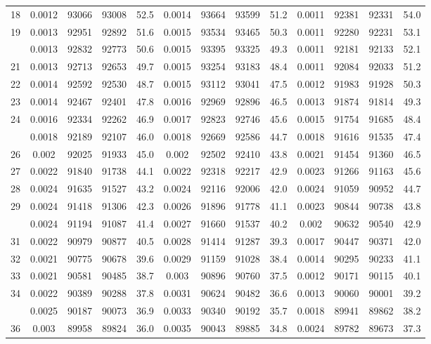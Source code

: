 \documentclass[
  14pt,
]{article}
\begin{document}
\begin{longtable}[t]{lcccccccccccc}
18 & 0.0012 & 93066 & 93008 & 52.5 & 0.0014 & 93664 & 93599 & 51.2 & 0.0011 & 92381 & 92331 & 54.0\\
19 & 0.0013 & 92951 & 92892 & 51.6 & 0.0015 & 93534 & 93465 & 50.3 & 0.0011 & 92280 & 92231 & 53.1\\
\addlinespace
20 & 0.0013 & 92832 & 92773 & 50.6 & 0.0015 & 93395 & 93325 & 49.3 & 0.0011 & 92181 & 92133 & 52.1\\
21 & 0.0013 & 92713 & 92653 & 49.7 & 0.0015 & 93254 & 93183 & 48.4 & 0.0011 & 92084 & 92033 & 51.2\\
22 & 0.0014 & 92592 & 92530 & 48.7 & 0.0015 & 93112 & 93041 & 47.5 & 0.0012 & 91983 & 91928 & 50.3\\
23 & 0.0014 & 92467 & 92401 & 47.8 & 0.0016 & 92969 & 92896 & 46.5 & 0.0013 & 91874 & 91814 & 49.3\\
24 & 0.0016 & 92334 & 92262 & 46.9 & 0.0017 & 92823 & 92746 & 45.6 & 0.0015 & 91754 & 91685 & 48.4\\
\addlinespace
25 & 0.0018 & 92189 & 92107 & 46.0 & 0.0018 & 92669 & 92586 & 44.7 & 0.0018 & 91616 & 91535 & 47.4\\
26 & 0.002 & 92025 & 91933 & 45.0 & 0.002 & 92502 & 92410 & 43.8 & 0.0021 & 91454 & 91360 & 46.5\\
27 & 0.0022 & 91840 & 91738 & 44.1 & 0.0022 & 92318 & 92217 & 42.9 & 0.0023 & 91266 & 91163 & 45.6\\
28 & 0.0024 & 91635 & 91527 & 43.2 & 0.0024 & 92116 & 92006 & 42.0 & 0.0024 & 91059 & 90952 & 44.7\\
29 & 0.0024 & 91418 & 91306 & 42.3 & 0.0026 & 91896 & 91778 & 41.1 & 0.0023 & 90844 & 90738 & 43.8\\
\addlinespace
30 & 0.0024 & 91194 & 91087 & 41.4 & 0.0027 & 91660 & 91537 & 40.2 & 0.002 & 90632 & 90540 & 42.9\\
31 & 0.0022 & 90979 & 90877 & 40.5 & 0.0028 & 91414 & 91287 & 39.3 & 0.0017 & 90447 & 90371 & 42.0\\
32 & 0.0021 & 90775 & 90678 & 39.6 & 0.0029 & 91159 & 91028 & 38.4 & 0.0014 & 90295 & 90233 & 41.1\\
33 & 0.0021 & 90581 & 90485 & 38.7 & 0.003 & 90896 & 90760 & 37.5 & 0.0012 & 90171 & 90115 & 40.1\\
34 & 0.0022 & 90389 & 90288 & 37.8 & 0.0031 & 90624 & 90482 & 36.6 & 0.0013 & 90060 & 90001 & 39.2\\
\addlinespace
35 & 0.0025 & 90187 & 90073 & 36.9 & 0.0033 & 90340 & 90192 & 35.7 & 0.0018 & 89941 & 89862 & 38.2\\
36 & 0.003 & 89958 & 89824 & 36.0 & 0.0035 & 90043 & 89885 & 34.8 & 0.0024 & 89782 & 89673 & 37.3\\

\end{longtable}
\end{document}
